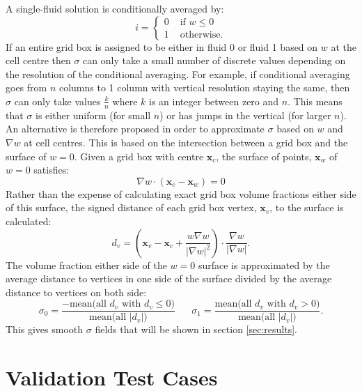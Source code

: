 \documentclass[draft]{agujournal2019}
\begin{document}
A single-fluid solution is conditionally averaged by:
\begin{equation}
i =
\begin{cases}
    0 & \text{ if }w\le 0 \\
    1 & \text{ otherwise.}
\end{cases}
\end{equation}
If an entire grid box is assigned to be either in fluid 0 or fluid 1 based on $w$ at the cell centre then $\sigma$ can only take a small number of discrete values depending on the resolution of the conditional averaging. For example, if conditional averaging goes from $n$ columns to 1 column with vertical resolution staying the same, then $\sigma$ can only take values $\frac{k}{n}$ where $k$ is an integer between zero and $n$. This means that $\sigma$ is either uniform (for small $n$) or has jumps in the vertical (for larger $n$). An alternative is therefore proposed in order to approximate $\sigma$ based on $w$ and $\nabla w$ at cell centres. This is based on the intersection between a grid box and the surface of $w=0$. Given a grid box with centre $\mathbf{x}_c$, the surface of points, $\mathbf{x}_w$ of $w=0$ satisfies:
\begin{equation}
\nabla w \cdot \left(\mathbf{x}_c - \mathbf{x}_w\right) = 0
\end{equation}
Rather than the expense of calculating exact grid box volume fractions either side of this surface, the signed distance of each grid box vertex, $\mathbf{x}_v$, to the surface is calculated:
\begin{equation}
d_v = \left(
     \mathbf{x}_v - \mathbf{x}_c + \frac{w \nabla w}{|\nabla w|^2} 
\right) \cdot \frac{\nabla w}{|\nabla w|}.
\end{equation}
The volume fraction either side of the $w=0$ surface is approximated by the average distance to vertices in one side of the surface divided by the average distance to vertices on both side:
\begin{equation}
\sigma_0 = 
\frac{-\text{mean}\bigl(\text{all } d_v \text{ with } d_v \le 0\bigr)}
{\text{mean}\bigl(\text{all } |d_v| \bigl)}
\;\;\;\;\;\;
\sigma_1 = 
\frac{\text{mean}\bigl(\text{all } d_v \text{ with } d_v > 0\bigr)}
{\text{mean}\bigl(\text{all } |d_v| \bigl)}.
\end{equation}
This gives smooth $\sigma$ fields that will be shown in section \ref{sec:results}.

\section{Validation Test Cases\label{sec:results}}
\end{document}
